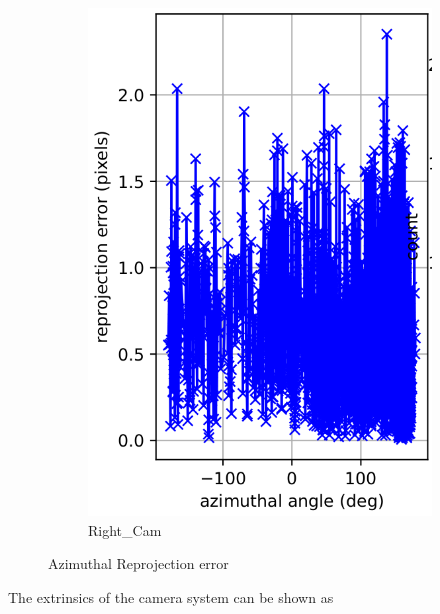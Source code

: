 \documentclass{article}
\begin{document}
\begin{figure}
\begin{subfigure}[b]{0.3\textwidth}
         \includegraphics[width=\textwidth]{cam2az.png}
         \caption{Right\_Cam}
     \end{subfigure}
        \caption{Azimuthal Reprojection error}
\end{figure}

\newpage

The extrinsics of the camera system can be shown as
\end{document}
